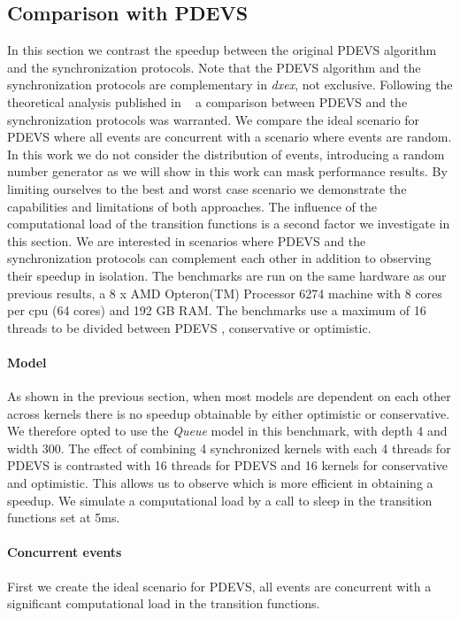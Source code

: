 \subsection{Comparison with PDEVS}
In this section we contrast the speedup between the original PDEVS algorithm and the synchronization protocols. 
Note that the PDEVS algorithm and the synchronization protocols are complementary in \textit{dxex}, not exclusive. 
Following the theoretical analysis published in ~\cite{amdahlpdevs} a comparison between PDEVS and the synchronization protocols was warranted. 
We compare the ideal scenario for PDEVS where all events are concurrent with a scenario where events are random.
In this work we do not consider the distribution of events, introducing a random number generator as we will show in this work can mask performance results. 
By limiting ourselves to the best and worst case scenario we demonstrate the capabilities and limitations of both approaches.
The influence of the computational load of the transition functions is a second factor we investigate in this section.
We are interested in scenarios where PDEVS and the synchronization protocols can complement each other in addition to observing their speedup in isolation.
The benchmarks are run on the same hardware as our previous results, a 8 x AMD Opteron(TM) Processor 6274 machine with 8 cores per cpu (64 cores) and 192 GB RAM. 
The benchmarks use a maximum of 16 threads to be divided between PDEVS , conservative or optimistic. 

\paragraph{Model}
As shown in the previous section, when most models are dependent on each other across kernels there is no speedup obtainable by either optimistic or conservative. 
We therefore opted to use the \textit{Queue} model in this benchmark, with depth 4 and width 300.
The effect of combining 4 synchronized kernels with each 4 threads for PDEVS is contrasted with 16 threads for PDEVS and 16 kernels for conservative and optimistic.  
This allows us to observe which is more efficient in obtaining a speedup.
We simulate a computational load by a call to sleep in the transition functions set at 5ms. 

\paragraph{Concurrent events}
First we create the ideal scenario for PDEVS, all events are concurrent with a significant computational load in the transition functions. 


